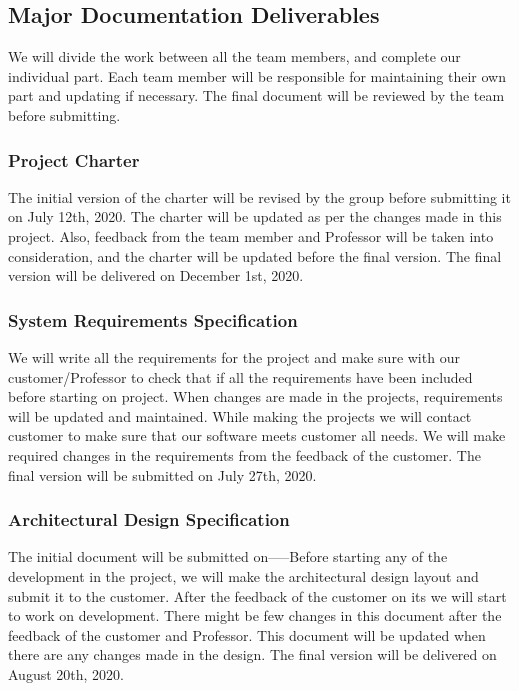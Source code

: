 
\subsection{Major Documentation Deliverables}
We will divide the work between all the team members, and complete our individual part. Each team member will be responsible for maintaining their own part and updating if necessary. The final document will be reviewed by the team before submitting.  
\subsubsection{Project Charter}
The initial version of the charter will be revised by the group before submitting it on July 12th, 2020. The charter will be updated as per the changes made in this project. Also, feedback from the team member and Professor will be taken into consideration, and the charter will be updated before the final version. The final version will be delivered on December 1st, 2020.
\subsubsection{System Requirements Specification}
We will write all the requirements for the project and make sure with our customer/Professor to check that if all the requirements have been included before starting on project. When changes are made in the projects, requirements will be updated and maintained. While making the projects we will contact customer to make sure that our software meets customer all needs. We will make required changes in the requirements from the feedback of the customer. The final version will be submitted on July 27th, 2020.
\subsubsection{Architectural Design Specification}
The initial document will be submitted on-----Before starting any of the development in the project, we will make the architectural design layout and submit it to the customer. After the feedback of the customer on its we will start to work on development. There might be few changes in this document after the feedback of the customer and Professor.  This document will be updated when there are any changes made in the design. The final version will be delivered on August 20th, 2020.

